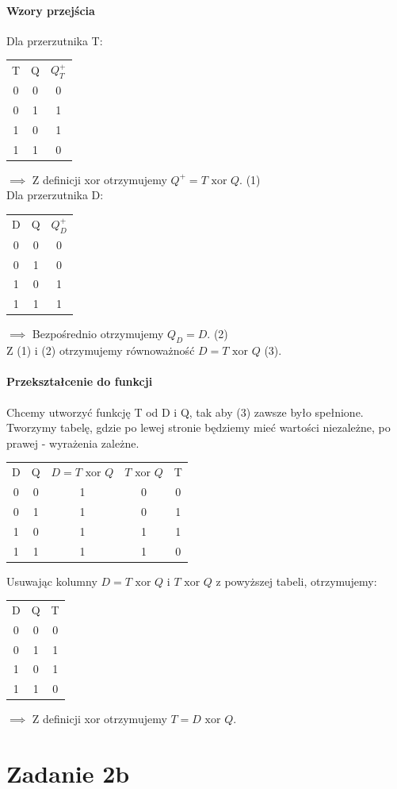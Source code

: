 \documentclass{article}
\begin{document}
\paragraph{Wzory przejścia}
Dla przerzutnika T: \\
\begin{tabular}{c c c}
T & Q & $Q_{T}^{+}$ \\
0 & 0 & 0 \\
0 & 1 & 1 \\
1 & 0 & 1 \\
1 & 1 & 0
\end{tabular}
$\implies$ Z definicji xor otrzymujemy $Q^{+} = T \text{ xor } Q$. (1) \\
Dla przerzutnika D: \\
\begin{tabular}{c c c}
D & Q & $Q_{D}^{+}$ \\
0 & 0 & 0 \\
0 & 1 & 0 \\
1 & 0 & 1 \\
1 & 1 & 1
\end{tabular}
$\implies $ Bezpośrednio otrzymujemy $Q_{D} = D$. (2)\\
Z (1) i (2) otrzymujemy równoważność $D = T \text{ xor } Q$ (3).
\paragraph{Przekształcenie do funkcji}
Chcemy utworzyć funkcję T od D i Q, tak aby (3) zawsze było spełnione. Tworzymy tabelę, gdzie po lewej stronie będziemy mieć wartości niezależne, po prawej - wyrażenia zależne.
\begin{center}
\begin{tabular}{c c c | c c }
D & Q & $D = T \text{ xor } Q$ & $T \text{ xor } Q$ & T \\
0 & 0 & 1 & 0 & 0\\
0 & 1 & 1 & 0 & 1\\
1 & 0 & 1 & 1 & 1\\
1 & 1 & 1 & 1 & 0
\end{tabular}
\end{center}
Usuwając kolumny $D = T \text{ xor } Q$ i $T \text{ xor } Q$ z powyższej tabeli, otrzymujemy:
\begin{tabular}{c c c }
D & Q & T \\
0 & 0 & 0\\
0 & 1 & 1\\
1 & 0 & 1\\
1 & 1 & 0
\end{tabular} $\implies$ Z definicji xor otrzymujemy $ T = D \text{ xor } Q$. \\

\section{Zadanie 2b}
\end{document}
